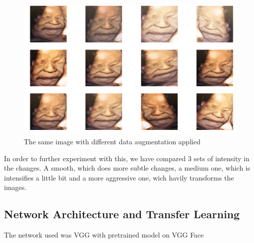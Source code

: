 \begin{figure}[h!tp]
    \centering
    \includegraphics[width=.9\textwidth]{imgs/chap3_data_augmentation.png}
    \caption{The same image with different data augmentation applied}
    \label{fig:data_augmentation}
\end{figure}

In order to further experiment with this, we have compared 3 sets of intensity in the changes. A smooth, which does more subtle changes, a medium one, which is intensifies a little bit and a more aggressive one, wich havily transforms the images.  

\subsection{Network Architecture and Transfer Learning}

The network used was VGG with pretrained model on VGG Face



